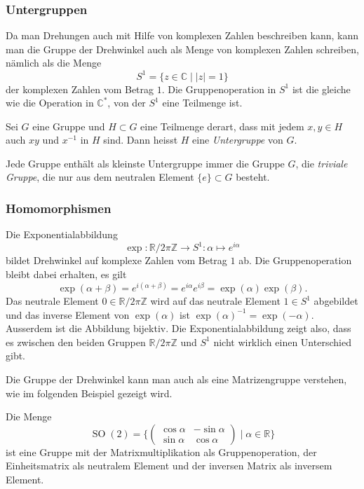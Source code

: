 %
%
\subsubsection{Untergruppen}
Da man Drehungen auch mit Hilfe von komplexen Zahlen beschreiben kann,
kann man die Gruppe der Drehwinkel auch als Menge von komplexen Zahlen
schreiben, nämlich als die Menge
\[
S^1
=
\{z\in\mathbb{C}\mid |z|=1\}
\]
der komplexen Zahlen vom Betrag $1$.
Die Gruppenoperation in $S^1$ ist die gleiche wie die Operation
in $\mathbb{C}^*$, von der $S^1$ eine Teilmenge ist.

\begin{definition}
\label{buch:gruppen:definition:def:untergruppe}
Sei $G$ eine Gruppe und $H\subset G$ eine Teilmenge derart,
dass mit jedem $x,y\in H$ auch $xy$ und $x^{-1}$ in $H$ sind.
Dann heisst $H$ eine {\em Untergruppe} von $G$.
%
\end{definition}

Jede Gruppe enthält als kleinste Untergruppe immer die Gruppe $G$,
die {\em triviale Gruppe}, die nur aus dem neutralen Element
$\{e\}\subset G$ besteht.

%
%
\subsubsection{Homomorphismen}
Die Exponentialabbildung
\[
\exp
\colon
\mathbb{R}/2\pi\mathbb{Z} \to S^1
:
\alpha \mapsto e^{i\alpha}
\]
bildet Drehwinkel auf komplexe Zahlen vom Betrag $1$ ab.
Die Gruppenoperation bleibt dabei erhalten, es gilt
\[
\exp(\alpha + \beta)
=
e^{i(\alpha+\beta)}
=
e^{i\alpha}
e^{i\beta}
=
\exp(\alpha)
\exp(\beta).
\]
Das neutrale Element $0\in\mathbb{R}/2\pi\mathbb{Z}$ wird auf
das neutrale Element $1\in S^1$ abgebildet und das inverse
Element von $\exp(\alpha)$ ist
$ \exp(\alpha)^{-1} = \exp(-\alpha) $.
Ausserdem ist die Abbildung bijektiv.
Die Exponentialabbildung zeigt also, dass es zwischen den beiden
Gruppen $\mathbb{R}/2\pi\mathbb{Z}$ und $S^1$ nicht wirklich einen
Unterschied gibt.

Die Gruppe der Drehwinkel kann man auch als eine Matrizengruppe
verstehen, wie im folgenden Beispiel gezeigt wird.

\begin{beispiel}
Die Menge
\[
\operatorname{SO}(2)
=
\biggl\{
\begin{pmatrix}
\cos\alpha & -\sin\alpha \\
\sin\alpha &  \cos\alpha
\end{pmatrix}
\;
\bigg|
\;
\alpha\in\mathbb{R}
\biggr\}
\]
ist eine Gruppe mit der Matrixmultiplikation als Gruppenoperation,
der Einheitsmatrix als neutralem Element und der inversen Matrix
als inversem Element.
\end{beispiel}

